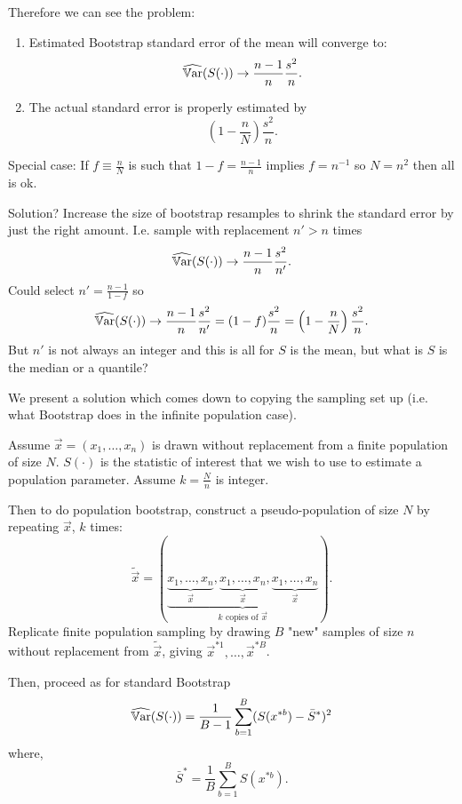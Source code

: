 \documentclass[10pt, a4paper]{article}
\begin{document}
Therefore we can see the problem:
\begin{enumerate}[label = (\roman*)]
    \item Estimated Bootstrap standard error of the mean will converge to:
    \[
    \widehat{\mathbb{V}\mathrm{ar}}(S(\cdot)) \to \frac{n - 1}{n}\frac{s ^ 2}{n}.
    \]

    \item The actual standard error is properly estimated by
    \[
    \left(1 - \frac{n}{N}\right)\frac{s ^ 2}{n}.
    \]
\end{enumerate}

Special case:
If $f \equiv \frac{n}{N}$ is such that $1 - f = \frac{n - 1}{n}$ implies $f = n ^ {-1}$ so $N = n ^ 2$ then all is ok.

Solution?
Increase the size of bootstrap resamples to shrink the standard error by just the right amount.
I.e. sample with replacement $n' > n$ times
\[
\widehat{\mathbb{V}\mathrm{ar}}(S(\cdot)) \to \frac{n - 1}{n}\frac{s ^ 2}{n'}.
\]
Could select $n' = \frac{n - 1}{1 - f}$ so
\[
\widehat{\mathbb{V}\mathrm{ar}}(S(\cdot)) \to \frac{n - 1}{n}\frac{s ^ 2}{n'} = (1 - f)\frac{s ^ 2}{n} = \left(1 - \frac{n}{N}\right)\frac{s ^ 2}{n}.
\]
But $n'$ is not always an integer and this is all for $S$ is the mean,
but what is $S$ is the median or a quantile?

We present a solution which comes down to copying the sampling set up
(i.e. what Bootstrap does in the infinite population case).

\begin{definition}
    Assume $\vec{x} = (x_1, \dotsc, x_n)$ is drawn without replacement from a finite population of size $N$.
    $S(\cdot)$ is the statistic of interest that we wish to use to estimate a population parameter.
    Assume $k = \frac{N}{n}$ is integer.

    Then to do population bootstrap,
    construct a pseudo-population of size $N$ by repeating $\vec{x}$,
    $k$ times:
    \[
    \tilde{\vec{x}} = (\underbrace{\underbrace{x_1, \dotsc, x_n}_{\vec{x}}, \underbrace{x_1, \dotsc, x_n}_{\vec{x}}, \underbrace{x_1, \dotsc, x_n}_{\vec{x}}}_{\text{$k$ copies of $\vec{x}$}}).
    \]
    Replicate finite population sampling by drawing $B$
    "new"
    samples of size $n$ without replacement from $\tilde{\vec{x}}$,
    giving $\vec{x} ^ {*1}, \dotsc, \vec{x} ^ {*B}$.

    Then,
    proceed as for standard Bootstrap
    \[
    \widehat{\mathbb{V}\mathrm{ar}}(S(\cdot)) = \frac{1}{B - 1}\sum_{b = 1}^{B}(S(x ^ {*b}) - \bar{S} ^ {*}) ^ 2
    \]
    where,
    \[
    \bar{S} ^ {*} = \frac{1}{B}\sum_{b = 1}^{B}S(x ^ {*b}).
    \]
\end{definition}
\end{document}
